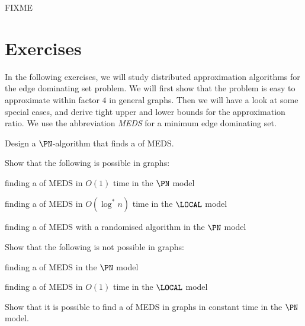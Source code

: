 
FIXME

\section{Exercises}

In the following exercises, we will study distributed approximation algorithms for the edge dominating set problem. We will first show that the problem is easy to approximate within factor $4$ in general graphs. Then we will have a look at some special cases, and derive tight upper and lower bounds for the approximation ratio. We use the abbreviation \emph{MEDS} for a minimum edge dominating set.

\begin{ex}\label{ex:edsfirst}
    Design a $\PN$-algorithm that finds a  of MEDS.
    
\end{ex}

\begin{ex}
    Show that the following is possible in  graphs:
    \begin{subex}
        \item finding a  of MEDS in $O(1)$ time in the $\PN$ model
        \item finding a  of MEDS in $O(\log^* n)$ time in the $\LOCAL$ model
        \item finding a  of MEDS with a randomised algorithm in the $\PN$ model
    \end{subex}
\end{ex}

\begin{ex}
    Show that the following is not possible in  graphs:
    \begin{subex}
        \item finding a  of MEDS in the $\PN$ model
        \item finding a  of MEDS in $O(1)$ time in the $\LOCAL$ model
    \end{subex}
\end{ex}

\begin{ex}
    Show that it is possible to find a  of MEDS in  graphs in constant time in the $\PN$ model.
    
\end{ex}

